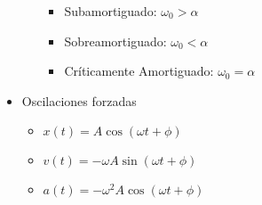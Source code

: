 \documentclass[12pt,a4paper]{article}
\begin{document}
\begin{itemize}
\begin{multicols}{2}
\begin{itemize}
						\begin{itemize}
							\item Subamortiguado: $\omega_{0} > \alpha$
							\item Sobreamortiguado: $\omega_{0} < \alpha$
							\item Críticamente Amortiguado: $\omega_{0} = \alpha$
						\end{itemize}
					\end{itemize}
				\end{multicols}
			\item Oscilaciones forzadas
				\begin{multicols}{3}
					\begin{itemize}
						\item $x(t) = A \cos (\omega t + \phi)$
						\item $v(t) = - \omega A \sin (\omega t + \phi)$
						\item $a(t) = - \omega^{2} A \cos (\omega t + \phi)$
					\end{itemize}
				\end{multicols}
		\end{itemize}
\end{document}
